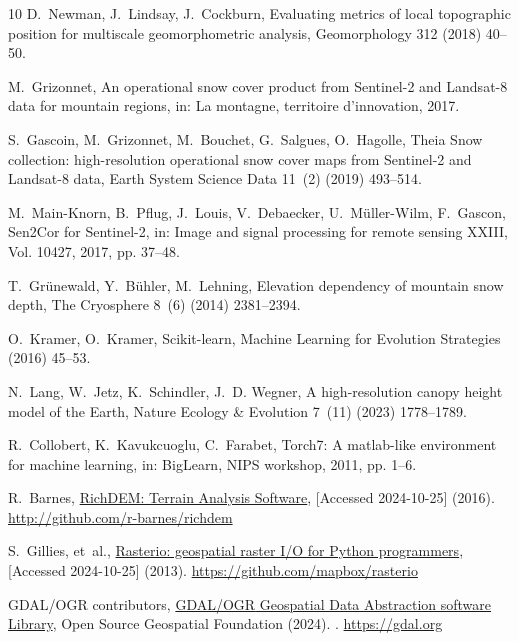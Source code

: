 \documentclass[preprint,12pt]{elsarticle}
\begin{document}
\begin{thebibliography}{10}
D.~Newman, J.~Lindsay, J.~Cockburn, Evaluating metrics of local topographic position for multiscale geomorphometric analysis, Geomorphology 312 (2018) 40--50.

M.~Grizonnet, {An operational snow cover product from Sentinel-2 and Landsat-8 data for mountain regions}, in: La montagne, territoire d'innovation, 2017.

S.~Gascoin, M.~Grizonnet, M.~Bouchet, G.~Salgues, O.~Hagolle, {Theia Snow collection: high-resolution operational snow cover maps from Sentinel-2 and Landsat-8 data}, Earth System Science Data 11~(2) (2019) 493--514.

M.~Main-Knorn, B.~Pflug, J.~Louis, V.~Debaecker, U.~M{\"u}ller-Wilm, F.~Gascon, {Sen2Cor for Sentinel-2}, in: Image and signal processing for remote sensing XXIII, Vol. 10427, 2017, pp. 37--48.

T.~Gr\"unewald, Y.~B\"uhler, M.~Lehning, Elevation dependency of mountain snow depth, The Cryosphere 8~(6) (2014) 2381--2394.

O.~Kramer, O.~Kramer, Scikit-learn, Machine Learning for Evolution Strategies (2016) 45--53.

N.~Lang, W.~Jetz, K.~Schindler, J.~D. Wegner, {A high-resolution canopy height model of the Earth}, Nature Ecology \& Evolution 7~(11) (2023) 1778–1789.

R.~Collobert, K.~Kavukcuoglu, C.~Farabet, {Torch7: A matlab-like environment for machine learning}, in: BigLearn, NIPS workshop, 2011, pp. 1--6.

R.~Barnes, \href{http://github.com/r-barnes/richdem}{{RichDEM: Terrain Analysis Software}}, [Accessed 2024-10-25] (2016).
\newline\urlprefix\url{http://github.com/r-barnes/richdem}

S.~Gillies, et~al., \href{https://github.com/mapbox/rasterio}{{Rasterio: geospatial raster I/O for Python programmers}}, [Accessed 2024-10-25] (2013).
\newline\urlprefix\url{https://github.com/mapbox/rasterio}

{GDAL/OGR contributors}, \href{https://gdal.org}{{GDAL/OGR} Geospatial Data Abstraction software Library}, Open Source Geospatial Foundation (2024).
\newblock \href {https://doi.org/10.5281/zenodo.5884351} {}.
\newline\urlprefix\url{https://gdal.org}


\end{thebibliography}
\end{document}

